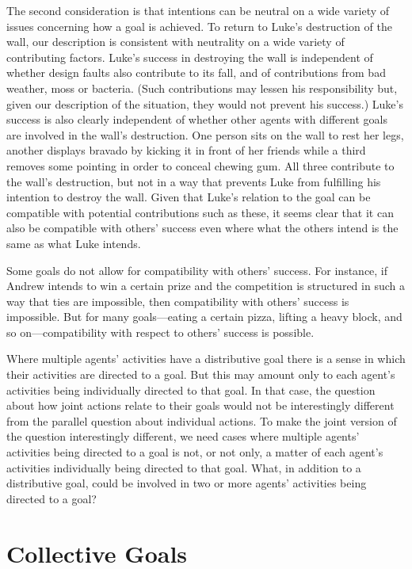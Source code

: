 \documentclass[12pt,a4paper]{extarticle}
\begin{document}
The second consideration is that intentions can be neutral on a wide variety of issues concerning how a goal is achieved.  
To return to Luke's destruction of the wall, our description is consistent with neutrality on a wide variety of contributing factors.
Luke's success in destroying the wall is independent of whether design faults also contribute to its fall, and of contributions from bad weather, moss or bacteria.
(Such contributions may lessen his responsibility but, given our description of the situation, they would not prevent his success.)
Luke's success is also clearly independent of whether other agents with different goals are involved in the wall's destruction.  
One person sits on the wall to rest her legs, another displays bravado by kicking it in front of her friends while a third removes some pointing in order to conceal chewing gum.
All three contribute to the wall's destruction, but not in a way that prevents Luke from fulfilling his intention to destroy the wall.
Given that Luke's relation to the goal can be compatible with potential contributions such as these, it seems clear that it can also be compatible with others' success even where what the others intend is the same as what Luke intends.

Some goals do not allow for compatibility with others'  success.  For instance, if Andrew intends to win a certain prize and the competition is structured in such a way that ties are impossible, then compatibility with others' success is impossible.  
But for many goals---eating a certain pizza, lifting a heavy block, and so on---compatibility with respect to others' success is possible.

Where multiple agents' activities have a distributive goal there is a sense in which their activities are directed to a goal.  But this may amount only to each agent's activities being individually directed to that goal.  In that case, the question about how joint actions relate to their goals would not be interestingly different from the parallel question about individual actions.
To make the joint version of the question interestingly different, we need cases where multiple agents' activities being directed to a goal is not, or not only, a matter of each agent's activities individually being directed to that goal.
What, in addition to a distributive goal, could be involved in two or more agents' activities being directed to a goal?



\section{Collective Goals}
\label{section_collective}
\end{document}
